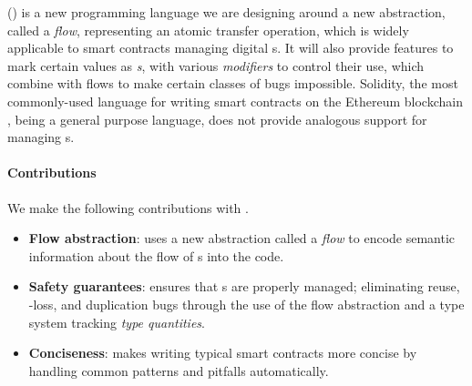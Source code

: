 \documentclass[dvipsnames, usenames, sigconf]{acmart}
\begin{document}
\langName (\langNamePronounce) is a new programming language we are designing around a new abstraction, called a \emph{flow}, representing an atomic transfer operation, which is widely applicable to smart contracts managing digital \assetTxt{}s.
It will also provide features to mark certain values as \emph{\assetTxt{}s}, with various \emph{modifiers} to control their use, which combine with flows to make certain classes of bugs impossible.
Solidity, the most commonly-used language for writing smart contracts on the Ethereum blockchain , being a general purpose language, does not provide analogous support for managing \assetTxt{}s.

\paragraph{Contributions}

We make the following contributions with \langName.
\begin{itemize}
    \item \textbf{Flow abstraction}: \langName uses a new abstraction called a \emph{flow} to encode semantic information about the flow of \assetTxt{}s into the code.
    \item \textbf{Safety guarantees}: \langName ensures that \assetTxt{}s are properly managed; eliminating reuse, \assetTxt-loss, and duplication bugs through the use of the flow abstraction and a type system tracking \emph{type quantities}.
    \item \textbf{Conciseness}: \langName makes writing typical smart contracts more concise by handling common patterns and pitfalls automatically.
\end{itemize}

\end{document}
